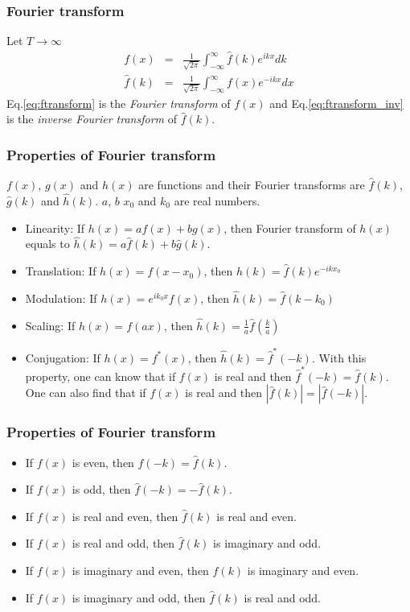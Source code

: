 \documentclass{beamer}
\begin{document}
\begin{frame}
\frametitle{Fourier transform}
Let $T\longrightarrow\infty$
\begin{eqnarray}
f(x)&=&\frac{1}{\sqrt{2\pi}}\int_{-\infty}^{\infty} \hat{f}(k) e^{ikx} dk
\label{eq:ftransform_inv}\\
\hat{f}(k)&=&\frac{1}{\sqrt{2\pi}}\int_{-\infty}^{\infty} f(x) e^{-ikx} dx
\label{eq:ftransform}
\end{eqnarray}
Eq.\ref{eq:ftransform} is the \emph{Fourier transform} of $f(x)$ and Eq.\ref{eq:ftransform_inv} is the \emph{inverse Fourier transform} of $\hat{f}(k)$.
\end{frame}
\begin{frame}
\frametitle{Properties of Fourier transform}
$f(x)$, $g(x)$ and $h(x)$ are functions and  their Fourier transforms are $\hat{f}(k)$, $\hat{g}(k)$ and $\hat{h}(k)$. $a$, $b$ $x_0$ and $k_0$ are real numbers.
\begin{itemize}
\item Linearity: If $h(x) = af(x)+bg(x)$, then Fourier transform of $h(x)$ equals to $\hat{h}(k) = a\hat{f}(k)+b\hat{g}(k)$.
\item Translation: If $h(x) = f(x-x_0)$, then $\hat{h}(k) = \hat{f}(k)e^{-ikx_0}$
\item Modulation: If $h(x) = e^{ik_0x}f(x)$, then $\hat{h}(k) = \hat{f}(k-k_0)$
\item Scaling: If $h(x) = f(ax)$, then $\hat{h}(k) = \frac{1}{a}\hat{f}(\frac{k}{a})$
\item Conjugation: If $h(x) = f^*(x)$, then $\hat{h}(k) = \hat{f}^*(-k)$. With this property, one can know that if $f(x)$ is real and then $\hat{f}^*(-k) = \hat{f}(k)$. One can also find that if $f(x)$ is real and then $|\hat{f}(k)| = |\hat{f}(-k)|$.
\end{itemize}
\end{frame}
\begin{frame}
\frametitle{Properties of Fourier transform}
\begin{itemize}
\item If $f(x)$ is even, then $\hat{f}(-k) = \hat{f}(k)$.
\item If $f(x)$ is odd, then $\hat{f}(-k) = -\hat{f}(k)$.
\item If $f(x)$ is real and even, then $\hat{f}(k)$ is real and even.
\item If $f(x)$ is real and odd, then $\hat{f}(k)$ is imaginary and odd.
\item If $f(x)$ is imaginary and even, then $\hat{f}(k)$ is imaginary and even.
\item If $f(x)$ is imaginary and odd, then $\hat{f}(k)$ is real and odd.
\end{itemize}
\end{frame}
\end{document}
